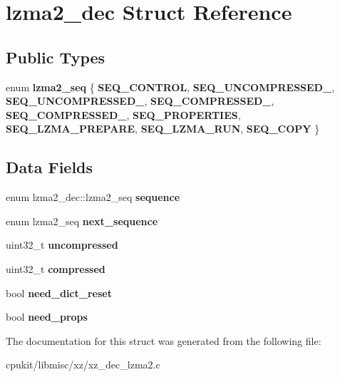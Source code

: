 \hypertarget{structlzma2__dec}{}\section{lzma2\+\_\+dec Struct Reference}
\label{structlzma2__dec}
\subsection*{Public Types}
\begin{DoxyCompactItemize}
\item 
\mbox{\label{structlzma2__dec_a162750ee40784fcf76518b6436c78aaf}} 
enum {\bfseries lzma2\+\_\+seq} \{ \newline
{\bfseries S\+E\+Q\+\_\+\+C\+O\+N\+T\+R\+OL}, 
{\bfseries S\+E\+Q\+\_\+\+U\+N\+C\+O\+M\+P\+R\+E\+S\+S\+E\+D\+\_}, 
{\bfseries S\+E\+Q\+\_\+\+U\+N\+C\+O\+M\+P\+R\+E\+S\+S\+E\+D\+\_}, 
{\bfseries S\+E\+Q\+\_\+\+C\+O\+M\+P\+R\+E\+S\+S\+E\+D\+\_}, 
\newline
{\bfseries S\+E\+Q\+\_\+\+C\+O\+M\+P\+R\+E\+S\+S\+E\+D\+\_}, 
{\bfseries S\+E\+Q\+\_\+\+P\+R\+O\+P\+E\+R\+T\+I\+ES}, 
{\bfseries S\+E\+Q\+\_\+\+L\+Z\+M\+A\+\_\+\+P\+R\+E\+P\+A\+RE}, 
{\bfseries S\+E\+Q\+\_\+\+L\+Z\+M\+A\+\_\+\+R\+UN}, 
\newline
{\bfseries S\+E\+Q\+\_\+\+C\+O\+PY}
 \}
\end{DoxyCompactItemize}
\subsection*{Data Fields}
\begin{DoxyCompactItemize}
\item 
\mbox{\label{structlzma2__dec_a4821d6b4aabcbb9514408fb0ddf80a7a}} 
enum lzma2\+\_\+dec\+::lzma2\+\_\+seq {\bfseries sequence}
\item 
\mbox{\label{structlzma2__dec_a02dfab1cd3d95105d5504b9285b35e76}} 
enum lzma2\+\_\+seq {\bfseries next\+\_\+sequence}
\item 
\mbox{\label{structlzma2__dec_a14021d630f4fe1023dfb4e6f5eabc7e4}} 
uint32\+\_\+t {\bfseries uncompressed}
\item 
\mbox{\label{structlzma2__dec_a77e8ec23e6ae6d8c4131b2cdb4a89ca2}} 
uint32\+\_\+t {\bfseries compressed}
\item 
\mbox{\label{structlzma2__dec_aadd6117d277b863f2278895f73f291e3}} 
bool {\bfseries need\+\_\+dict\+\_\+reset}
\item 
\mbox{\label{structlzma2__dec_af92626a936a7c702c9b43c7c097b513f}} 
bool {\bfseries need\+\_\+props}
\end{DoxyCompactItemize}


The documentation for this struct was generated from the following file\+:\begin{DoxyCompactItemize}
\item 
cpukit/libmisc/xz/xz\+\_\+dec\+\_\+lzma2.\+c\end{DoxyCompactItemize}
